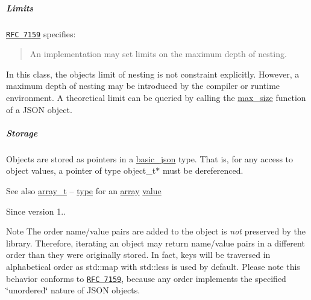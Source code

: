 \subparagraph*{Limits}

\href{http://rfc7159.net/rfc7159}{\tt R\+FC 7159} specifies\+: \begin{quote}
An implementation may set limits on the maximum depth of nesting. \end{quote}


In this class, the object\textquotesingle{}s limit of nesting is not constraint explicitly. However, a maximum depth of nesting may be introduced by the compiler or runtime environment. A theoretical limit can be queried by calling the \hyperlink{classnlohmann_1_1basic__json_a7936417b875b7ec737f77ef84bbf7871}{max\+\_\+size} function of a J\+S\+ON object.

\subparagraph*{Storage}

Objects are stored as pointers in a \hyperlink{classnlohmann_1_1basic__json}{basic\+\_\+json} type. That is, for any access to object values, a pointer of type {\ttfamily object\+\_\+t$\ast$} must be dereferenced.

\begin{DoxySeeAlso}{See also}
\hyperlink{classnlohmann_1_1basic__json_ab00b882d39306d663c23dab110f5cae0}{array\+\_\+t} -- \hyperlink{classnlohmann_1_1basic__json_a5d466b240d0ba9f648d7fd4ff42359f5}{type} for an \hyperlink{classnlohmann_1_1basic__json_a5685815624b086caa532f41e853d4b0f}{array} \hyperlink{classnlohmann_1_1basic__json_a407e73a037e6e3067ef7aa2c25a79f39}{value}
\end{DoxySeeAlso}
\begin{DoxySince}{Since}
version 1..
\end{DoxySince}
\begin{DoxyNote}{Note}
The order name/value pairs are added to the object is {\itshape not} preserved by the library. Therefore, iterating an object may return name/value pairs in a different order than they were originally stored. In fact, keys will be traversed in alphabetical order as {\ttfamily std\+::map} with {\ttfamily std\+::less} is used by default. Please note this behavior conforms to \href{http://rfc7159.net/rfc7159}{\tt R\+FC 7159}, because any order implements the specified \char`\"{}unordered\char`\"{} nature of J\+S\+ON objects. 
\end{DoxyNote}
\hypertarget{classnlohmann_1_1basic__json_a9e35475e2027520a78e09f460dbe048a}{}\label{classnlohmann_1_1basic__json_a9e35475e2027520a78e09f460dbe048a} 
